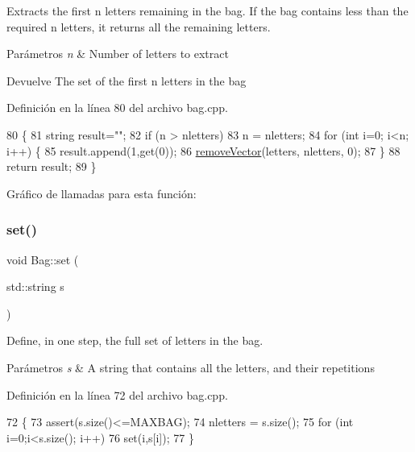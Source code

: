 Extracts the first {\ttfamily n} letters remaining in the bag. If the bag contains less than the required {\ttfamily n} letters, it returns all the remaining letters. 


\begin{DoxyParams}{Parámetros}
{\em n} & Number of letters to extract \\
\hline
\end{DoxyParams}
\begin{DoxyReturn}{Devuelve}
The set of the first {\ttfamily n} letters in the bag 
\end{DoxyReturn}


Definición en la línea 80 del archivo bag.\+cpp.


\begin{DoxyCode}
80                          \{
81     \textcolor{keywordtype}{string} result=\textcolor{stringliteral}{""};
82     \textcolor{keywordflow}{if} (n > nletters)
83         n = nletters;
84     \textcolor{keywordflow}{for} (\textcolor{keywordtype}{int} i=0; i<n; i++) \{
85         result.append(1,\textcolor{keyword}{get}(0));
86         \hyperlink{bag_8cpp_a8ccee2a743b58f469047c4b4406a71e2}{removeVector}(letters, nletters, 0);
87     \}
88     \textcolor{keywordflow}{return} result;
89 \}
\end{DoxyCode}
Gráfico de llamadas para esta función\+:
\mbox{\label{classBag_a3de5aa1629a7fdd40630d140adde2757}} 
\subsubsection{\texorpdfstring{set()}{set()}}
{\footnotesize\ttfamily void Bag\+::set (\begin{DoxyParamCaption}\item[{std\+::string}]{s }\end{DoxyParamCaption})}



Define, in one step, the full set of letters in the bag. 


\begin{DoxyParams}{Parámetros}
{\em s} & A string that contains all the letters, and their repetitions \\
\hline
\end{DoxyParams}


Definición en la línea 72 del archivo bag.\+cpp.


\begin{DoxyCode}
72                          \{
73     assert(s.size()<=MAXBAG);
74     nletters = s.size();
75     \textcolor{keywordflow}{for} (\textcolor{keywordtype}{int} i=0;i<s.size(); i++)
76         \textcolor{keyword}{set}(i,s[i]);
77 \}
\end{DoxyCode}
\mbox{\label{classBag_a32652be363a0f5d189b029ed863e5bf2}} 

